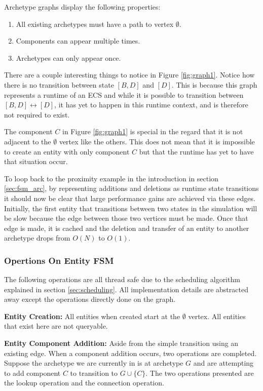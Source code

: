 Archetype graphs display the following properties:

\begin{enumerate}
    \item All existing archetypes must have a path to vertex $\emptyset$.
    \item Components can appear multiple times.
    \item Archetypes can only appear once.
\end{enumerate}

There are a couple interesting things to notice in Figure \ref{fig:graph1}. Notice how there is no transition between state $[B,D]$ and $[D]$. This is because this graph represents a runtime of an ECS and while it is possible to transition between $[B,D] \leftrightarrow [D]$, it has yet to happen in this runtime context, and is therefore not required to exist. 

The component $C$ in Figure \ref{fig:graph1} is special in the regard that it is not adjacent to the $\emptyset$ vertex like the others. This does not mean that it is impossible to create an entity with only component $C$ but that the runtime has yet to have that situation occur.

To loop back to the proximity example in the introduction in section \ref{sec:fsm_arc}, by representing additions and deletions as runtime state transitions it should now be clear that large performance gains are achieved via these edges. Initially, the first entity that transitions between two states in the simulation will be slow because the edge between those two vertices must be made. Once that edge is made, it is cached and the deletion and transfer of an entity to another archetype drops from $O(N)$ to $O(1)$.

\subsubsection{Opertions On Entity FSM}
The following operations are all thread safe due to the scheduling algorithm explained in section \ref{sec:scheduling}. All implementation details are abstracted away except the operations directly done on the graph. 

\textbf{Entity Creation:} All entities when created start at the $\emptyset$ vertex. All entities that exist here are not queryable.

\textbf{Entity Component Addition: } Aside from the simple transition using an existing edge. When a component addition occurs, two operations are completed. Suppose the archetype we are currently in is at archetype $G$ and are attempting to add component $C$ to transition to $G \cup \{C\}$. The two operations presented are the lookup operation and the connection operation.

